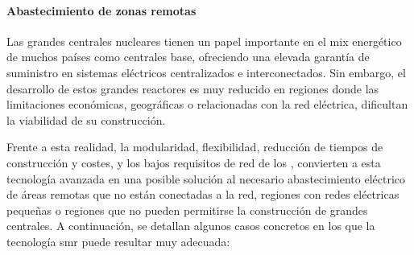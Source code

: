 \paragraph{Abastecimiento de zonas remotas} \label{zonas_remotas}

Las grandes centrales nucleares tienen un papel importante en el mix energético de muchos países como centrales base, ofreciendo una elevada garantía de suministro en sistemas eléctricos centralizados e interconectados. Sin embargo, el desarrollo de estos grandes reactores es muy reducido en regiones donde las limitaciones económicas, geográficas o relacionadas con la red eléctrica, dificultan la viabilidad de su construcción. 

Frente a esta realidad, la modularidad, flexibilidad, reducción de tiempos de construcción y costes, y los bajos requisitos de red de los , convierten a esta tecnología avanzada en una posible solución al necesario abastecimiento eléctrico de áreas remotas que no están conectadas a la red, regiones con redes eléctricas pequeñas o regiones que no pueden permitirse la construcción de grandes centrales. A continuación, se detallan algunos casos concretos en los que la tecnología \acrshort{smr} puede resultar muy adecuada:

